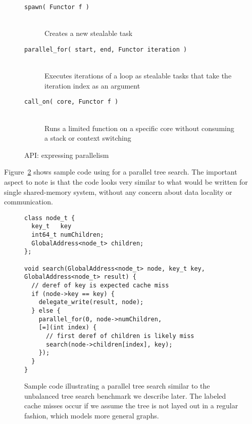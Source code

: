 \begin{figure}[htbp]
  \begin{center}
	\begin{description}
    \item[\texttt{spawn( Functor f )}] \hfill \\
      Creates a new stealable task
    \item[\texttt{parallel\_for( start, end, Functor iteration )}] \hfill \\
      Executes iterations of a loop as stealable tasks that
      take the iteration index as an argument
    \item[\texttt{call\_on( core, Functor f )}] \hfill \\
      Runs a limited function on a specific core without
      consuming a stack or context switching
	\end{description}
    \begin{minipage}{0.95\columnwidth}
      \caption{\label{fig:expressing-parallelism} \Grappa API: expressing parallelism
      } %
    \end{minipage}
  \end{center}
\end{figure}

Figure~\ref{fig:sample} shows sample code using \Grappa for a parallel tree
search. The important aspect to note is that the code looks very similar to
what would be written for single shared-memory system, without any concern about data locality or communication.

\begin{figure}[htbp]
\begin{center}
\begin{scriptsize}
\begin{lstlisting}[style=grappa]
class node_t {
  key_t   key
  int64_t numChildren;
  GlobalAddress<node_t> children;
};

void search(GlobalAddress<node_t> node, key_t key, GlobalAddress<node_t> result) {
  // deref of key is expected cache miss
  if (node->key == key) {
    delegate_write(result, node);
  } else {
    parallel_for(0, node->numChildren,
    [=](int index) {
      // first deref of children is likely miss
      search(node->children[index], key); 
    });
  }
}
\end{lstlisting}
\end{scriptsize}

    \begin{minipage}{0.95\columnwidth}
      \caption{\label{fig:sample} Sample \Grappa code illustrating a
          parallel tree search similar to the unbalanced tree search
          benchmark we describe later. The labeled cache misses occur
          if we assume the tree is not layed out in a regular fashion, which
      models more general graphs.}
    \end{minipage}

\end{center}
\end{figure}

